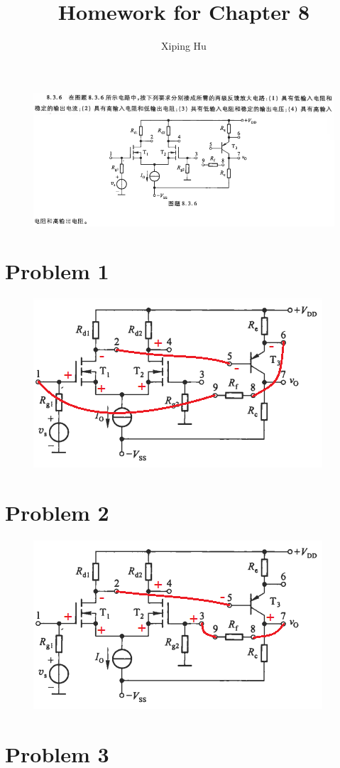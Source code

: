 \documentclass{article}
\author{Xiping Hu}
\affil{https://hxp.plus/}
\title{Homework for Chapter 8}
\begin{document}
\maketitle

\begin{figure}[H]
  \centering
  \includegraphics[width=\linewidth]{figures/Problem836}
\end{figure}

\section{Problem 1}
\begin{figure}[H]
  \centering
  \includegraphics[width=0.3\linewidth]{figures/Problem8361}
\end{figure}

\section{Problem 2}

\begin{figure}[H]
  \centering
  \includegraphics[width=0.3\linewidth]{figures/Problem8362}
\end{figure}

\section{Problem 3}
\end{document}
